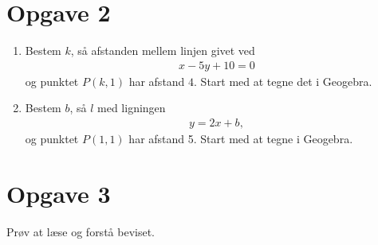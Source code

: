 \section*{Opgave 2}
\begin{enumerate}[label=\roman*)]
\item Bestem $k$, så afstanden mellem linjen givet ved 
\begin{align*}
x-5y+10 = 0
\end{align*}
og punktet $P(k,1)$ har afstand $4$. Start med at tegne det i Geogebra.
\item Bestem $b$, så $l$ med ligningen
\begin{align*}
y = 2x+b,
\end{align*}
 og punktet $P(1,1)$ har afstand 5. Start med at tegne i Geogebra.
\end{enumerate}

\section*{Opgave 3}
Prøv at læse og forstå beviset.